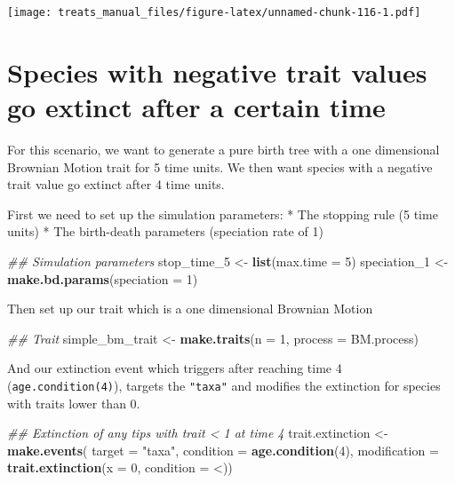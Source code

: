 \documentclass[
]{book}
\newenvironment{Shaded}{\begin{snugshade}}{\end{snugshade}}
\newcommand{\CommentTok}[1]{\textcolor[rgb]{0.56,0.35,0.01}{\textit{#1}}}
\newcommand{\DataTypeTok}[1]{\textcolor[rgb]{0.13,0.29,0.53}{#1}}
\newcommand{\DecValTok}[1]{\textcolor[rgb]{0.00,0.00,0.81}{#1}}
\newcommand{\KeywordTok}[1]{\textcolor[rgb]{0.13,0.29,0.53}{\textbf{#1}}}
\newcommand{\NormalTok}[1]{#1}
\newcommand{\StringTok}[1]{\textcolor[rgb]{0.31,0.60,0.02}{#1}}
\begin{document}
\texttt{[image: treats\_manual\_files/figure-latex/unnamed-chunk-116-1.pdf]}

\hypertarget{EGneg_ext}{%
\section{Species with negative trait values go extinct after a certain time}\label{EGneg_ext}}

For this scenario, we want to generate a pure birth tree with a one dimensional Brownian Motion trait for 5 time units.
We then want species with a negative trait value go extinct after 4 time units.

First we need to set up the simulation parameters:
* The stopping rule (5 time units)
* The birth-death parameters (speciation rate of 1)

\begin{Shaded}
\begin{Highlighting}[]
\CommentTok{\#\# Simulation parameters}
\NormalTok{stop\_time\_}\DecValTok{5}\NormalTok{ \textless{}{-}}\StringTok{ }\KeywordTok{list}\NormalTok{(}\DataTypeTok{max.time =} \DecValTok{5}\NormalTok{)}
\NormalTok{speciation\_}\DecValTok{1}\NormalTok{ \textless{}{-}}\StringTok{ }\KeywordTok{make.bd.params}\NormalTok{(}\DataTypeTok{speciation =} \DecValTok{1}\NormalTok{)}
\end{Highlighting}
\end{Shaded}

Then set up our trait which is a one dimensional Brownian Motion

\begin{Shaded}
\begin{Highlighting}[]
\CommentTok{\#\# Trait}
\NormalTok{simple\_bm\_trait \textless{}{-}}\StringTok{ }\KeywordTok{make.traits}\NormalTok{(}\DataTypeTok{n =} \DecValTok{1}\NormalTok{, }\DataTypeTok{process =}\NormalTok{ BM.process)}
\end{Highlighting}
\end{Shaded}

And our extinction event which triggers after reaching time 4 (\texttt{age.condition(4)}), targets the \texttt{"taxa"} and modifies the extinction for species with traits lower than 0.

\begin{Shaded}
\begin{Highlighting}[]
\CommentTok{\#\# Extinction of any tips with trait \textless{} 1 at time 4}
\NormalTok{trait.extinction \textless{}{-}}\StringTok{ }\KeywordTok{make.events}\NormalTok{(}
                      \DataTypeTok{target =} \StringTok{"taxa"}\NormalTok{,}
                      \DataTypeTok{condition =} \KeywordTok{age.condition}\NormalTok{(}\DecValTok{4}\NormalTok{),}
                      \DataTypeTok{modification =} \KeywordTok{trait.extinction}\NormalTok{(}\DataTypeTok{x =} \DecValTok{0}\NormalTok{,}
                                                      \DataTypeTok{condition =} \StringTok{\textasciigrave{}}\DataTypeTok{\textless{}}\StringTok{\textasciigrave{}}\NormalTok{))}
\end{Highlighting}
\end{Shaded}
\end{document}
